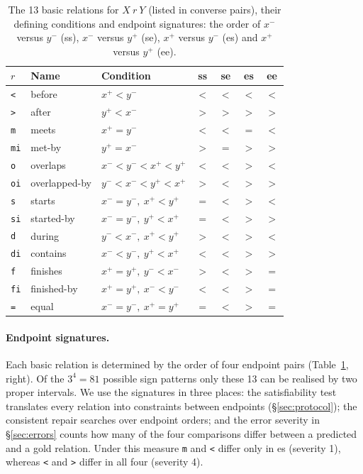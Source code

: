 \documentclass[11pt]{article}
\newcommand{\rel}[1]{\texttt{#1}}
\begin{document}
\begin{table}[!ht]
\centering
\footnotesize
\setlength{\tabcolsep}{2.4pt}
\begin{tabular}{l l l cccc}
\toprule
$r$ & Name & Condition & ss & se & es & ee \\
\midrule
\rel{{<}} & before & $x^+<y^-$ & $<$ & $<$ & $<$ & $<$ \\
\rel{{>}} & after & $y^+<x^-$ & $>$ & $>$ & $>$ & $>$ \\
\rel{m} & meets & $x^+=y^-$ & $<$ & $<$ & $=$ & $<$ \\
\rel{mi} & met-by & $y^+=x^-$ & $>$ & $=$ & $>$ & $>$ \\
\rel{o} & overlaps & $x^-<y^-<x^+<y^+$ & $<$ & $<$ & $>$ & $<$ \\
\rel{oi} & overlapped-by & $y^-<x^-<y^+<x^+$ & $>$ & $<$ & $>$ & $>$ \\
\rel{s} & starts & $x^-=y^-,\ x^+<y^+$ & $=$ & $<$ & $>$ & $<$ \\
\rel{si} & started-by & $x^-=y^-,\ y^+<x^+$ & $=$ & $<$ & $>$ & $>$ \\
\rel{d} & during & $y^-<x^-,\ x^+<y^+$ & $>$ & $<$ & $>$ & $<$ \\
\rel{di} & contains & $x^-<y^-,\ y^+<x^+$ & $<$ & $<$ & $>$ & $>$ \\
\rel{f} & finishes & $x^+=y^+,\ y^-<x^-$ & $>$ & $<$ & $>$ & $=$ \\
\rel{fi} & finished-by & $x^+=y^+,\ x^-<y^-$ & $<$ & $<$ & $>$ & $=$ \\
\rel{=} & equal & $x^-=y^-,\ x^+=y^+$ & $=$ & $<$ & $>$ & $=$ \\
\bottomrule
\end{tabular}
\caption{The 13 basic relations for $X\ r\ Y$ (listed in converse pairs), their defining conditions and endpoint signatures: the order of $x^-$ versus $y^-$ (ss), $x^-$ versus $y^+$ (se), $x^+$ versus $y^-$ (es) and $x^+$ versus $y^+$ (ee).}
\label{tab:allen}
\end{table}

\paragraph{Endpoint signatures.}
Each basic relation is determined by the order of four endpoint pairs (Table~\ref{tab:allen}, right). Of the $3^4=81$ possible sign patterns only these 13 can be realised by two proper intervals. We use the signatures in three places: the satisfiability test translates every relation into constraints between endpoints (\S\ref{sec:protocol}); the consistent repair searches over endpoint orders; and the error severity in \S\ref{sec:errors} counts how many of the four comparisons differ between a predicted and a gold relation. Under this measure \rel{m} and \rel{<} differ only in es (severity 1), whereas \rel{<} and \rel{>} differ in all four (severity 4).
\end{document}
